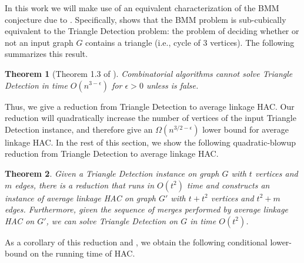 \documentclass[11pt]{article}
\newtheorem{theorem}{Theorem}
\begin{document}
In this work we will make use of an equivalent characterization of the BMM conjecture due to \cite{williams2010subcubic}. Specifically, \cite{williams2010subcubic} shows that the BMM problem is sub-cubically equivalent to the Triangle Detection problem: the problem of deciding whether or not an input graph $G$ contains a triangle (i.e., cycle of $3$ vertices). The following summarizes this result.
\begin{theorem}[Theorem 1.3 of \cite{williams2010subcubic}]\label{thm:bmmeq}
    Combinatorial algorithms cannot solve Triangle Detection in time $O(n^{3-\epsilon})$ for  $\epsilon > 0$ unless  is false.
\end{theorem}
Thus, we give a reduction from Triangle Detection to average linkage HAC. Our reduction will quadratically increase the number of vertices of the input Triangle Detection instance, and therefore give an $\Omega(n^{3/2 - \epsilon})$ lower bound for average linkage HAC. In the rest of this section, we show the following quadratic-blowup reduction from Triangle Detection to average linkage HAC.
%

\begin{theorem}\label{thm:lbreduction}
Given a Triangle Detection instance on graph $G$ with $t$ vertices and $m$ edges, there is a reduction that runs in $O(t^2)$ time and constructs an instance of average linkage HAC on graph $G'$ with $t + t^2$ vertices and $t^2 + m$ edges. 
Furthermore, given the sequence of merges performed by average linkage HAC on $G'$, we can solve Triangle Detection on $G$ in time $O(t^2)$.
\end{theorem}

As a corollary of this reduction and , we obtain the following conditional lower-bound on the running time of HAC.

\mainLowerSeq*
\end{document}

